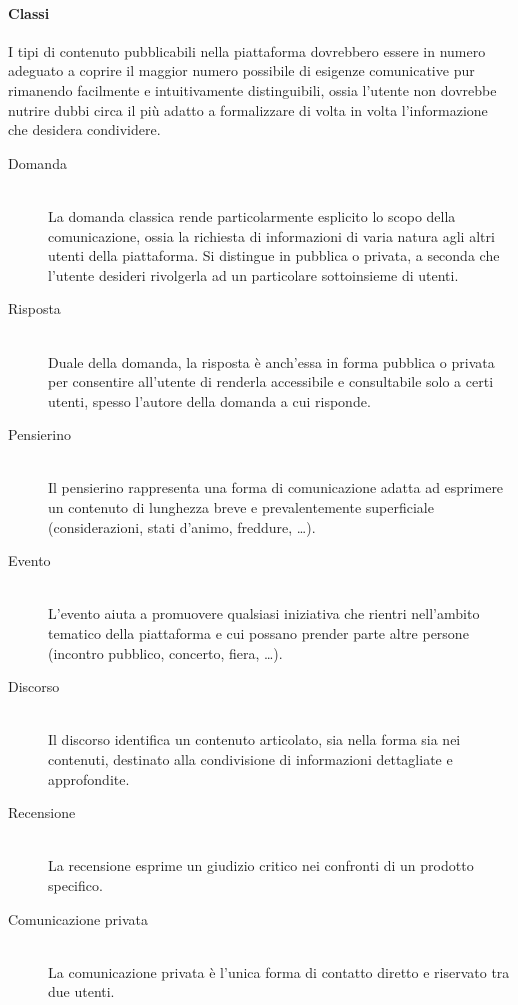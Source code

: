\paragraph{Classi}
I tipi di contenuto pubblicabili nella piattaforma dovrebbero essere in numero adeguato a coprire il maggior numero possibile di esigenze comunicative pur rimanendo facilmente e intuitivamente distinguibili, ossia l'utente non dovrebbe nutrire dubbi circa il più adatto a formalizzare di volta in volta l'informazione che desidera condividere.
\begin{description}
\item[Domanda] \hfill \\
La domanda classica rende particolarmente esplicito lo scopo della comunicazione, ossia la richiesta di informazioni di varia natura agli altri utenti della piattaforma. Si distingue in pubblica o privata, a seconda che l'utente desideri rivolgerla ad un particolare sottoinsieme di utenti. 
\item[Risposta] \hfill \\
Duale della domanda, la risposta è anch'essa in forma pubblica o privata per consentire all'utente di renderla accessibile e consultabile solo a certi utenti, spesso l'autore della domanda a cui risponde.
\item[Pensierino] \hfill \\
Il pensierino rappresenta una forma di comunicazione adatta ad esprimere un contenuto di lunghezza breve e prevalentemente superficiale (considerazioni, stati d'animo, freddure, \ldots).
\item[Evento] \hfill \\
L'evento aiuta a promuovere qualsiasi iniziativa che rientri nell'ambito tematico della piattaforma e cui possano prender parte altre persone (incontro pubblico, concerto, fiera, \ldots).
\item[Discorso] \hfill \\
Il discorso identifica un contenuto articolato, sia nella forma sia nei contenuti, destinato alla condivisione di informazioni dettagliate e approfondite.
\item[Recensione] \hfill \\
La recensione esprime un giudizio critico nei confronti di un prodotto specifico. 
\item[Comunicazione privata] \hfill \\
La comunicazione privata è l'unica forma di contatto diretto e riservato tra due utenti.
\end{description}

